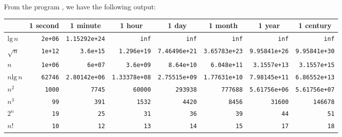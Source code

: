 From the program , we have the following
output:\par
\tiny\begin{tabular}{ l | r | r | r | r | r | r | r |}
    \qquad & \multicolumn{1}{c}{1 second} & \multicolumn{1}{c}{1 minute} 
          & \multicolumn{1}{c}{1 hour} & \multicolumn{1}{c}{1 day} & \multicolumn{1}{c}{1 month} 
          & \multicolumn{1}{c}{1 year} & \multicolumn{1}{c}{1 century} \\
    \hline
    $\text{lg}\,n$  & \texttt{2e+06}  & \texttt{1.15292e+24} & \texttt{inf}
    & \texttt{inf}         & \texttt{inf}         & \texttt{inf}         & \texttt{inf} \\
    \hline
    $\sqrt{n}$      & \texttt{1e+12}  & \texttt{3.6e+15}     & \texttt{1.296e+19}
    & \texttt{7.46496e+21} & \texttt{3.65783e+23} & \texttt{9.95841e+26} & \texttt{9.95841e+30} \\
    \hline
    $n$             & \texttt{1e+06}  & \texttt{6e+07}       & \texttt{3.6e+09}
    & \texttt{8.64e+10}    & \texttt{6.048e+11}   & \texttt{3.1557e+13}  & \texttt{3.1557e+15} \\
    \hline
    $n\text{lg}\,n$ & \texttt{62746}  & \texttt{2.80142e+06} & \texttt{1.33378e+08}
    & \texttt{2.75515e+09} & \texttt{1.77631e+10} & \texttt{7.98145e+11} & \texttt{6.86552e+13} \\
    \hline
    $n^2$           & \texttt{1000}   & \texttt{7745}        & \texttt{60000}
    & \texttt{293938}      & \texttt{777688}      & \texttt{5.61756e+06} & \texttt{5.61756e+07} \\
    \hline
    $n^3$           & \texttt{99}     & \texttt{391}         & \texttt{1532}
    & \texttt{4420}        & \texttt{8456}        & \texttt{31600}       & \texttt{146678} \\
    \hline
    $2^n$           & \texttt{19}     & \texttt{25}          & \texttt{31}
    & \texttt{36}          & \texttt{39}          & \texttt{44}          & \texttt{51} \\
    \hline
    $n!$            & \texttt{10}     & \texttt{12}          & \texttt{13}
    & \texttt{14}          & \texttt{15}          & \texttt{17}          & \texttt{18} \\
    \hline
\end{tabular}
